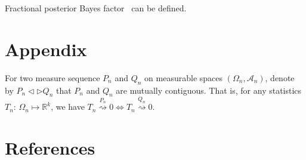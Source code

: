 \documentclass[3p]{elsarticle}
\theoremstyle{plain}
\theoremstyle{definition}
\theoremstyle{remark}
\begin{document}
Fractional posterior Bayes factor~\citep{Fractional1995} can be defined.


%




\section{Appendix}
For two measure sequence $P_n$ and $Q_n$ on measurable spaces $(\Omega_n,\mathcal{A}_n)$, denote by $P_n\triangleleft \triangleright Q_n$ that $P_n$ and $Q_n$ are mutually contiguous. That is, for any statistics $T_n$: $\Omega_n\mapsto \mathbb{R}^k$, we have $T_n\overset{P_n}{\rightsquigarrow}0\Leftrightarrow T_n\overset{Q_n}{\rightsquigarrow}0$.



\section*{References}


\end{document}
